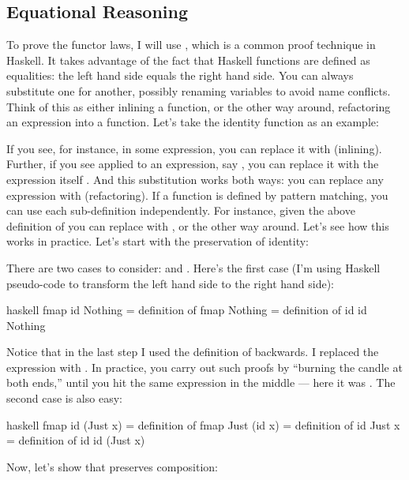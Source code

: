 \subsection{Equational Reasoning}

To prove the functor laws, I will use , which
is a common proof technique in Haskell. It takes advantage of the fact
that Haskell functions are defined as equalities: the left hand side
equals the right hand side. You can always substitute one for another,
possibly renaming variables to avoid name conflicts. Think of this as
either inlining a function, or the other way around, refactoring an
expression into a function. Let's take the identity function as an
example:

If you see, for instance,  in some expression, you can
replace it with  (inlining). Further, if you see 
applied to an expression, say , you can replace it
with the expression itself . And this substitution
works both ways: you can replace any expression  with
 (refactoring). If a function is defined by pattern
matching, you can use each sub-definition independently. For instance,
given the above definition of  you can replace
 with , or the other way
around. Let's see how this works in practice. Let's start with the
preservation of identity:

There are two cases to consider:  and .
Here's the first case (I'm using Haskell pseudo-code to transform the
left hand side to the right hand side):

\begin{snip}{haskell}
  fmap id Nothing
= { definition of fmap }
  Nothing
= { definition of id }
  id Nothing
\end{snip}
Notice that in the last step I used the definition of 
backwards. I replaced the expression  with
. In practice, you carry out such proofs by
``burning the candle at both ends,'' until you hit the same expression
in the middle --- here it was . The second case is also
easy:

\begin{snip}{haskell}
  fmap id (Just x)
= { definition of fmap }
  Just (id x)
= { definition of id }
  Just x
= { definition of id }
  id (Just x)
\end{snip}
Now, let's show that  preserves composition:


